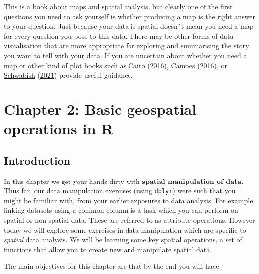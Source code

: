 \documentclass[
]{book}
\begin{document}
This is a book about maps and spatial analysis, but clearly one of the first questions you need to ask yourself is whether producing a map is the right answer to your question. Just because your data is spatial doesn´t mean you need a map for every question you pose to this data. There may be other forms of data visualisation that are more appropriate for exploring and summarising the story you want to tell with your data. If you are uncertain about whether you need a map or other kind of plot books such as \protect\hyperlink{ref-Cairo_2016}{Cairo} (\protect\hyperlink{ref-Cairo_2016}{2016}), \protect\hyperlink{ref-Camoes_2016}{Camoes} (\protect\hyperlink{ref-Camoes_2016}{2016}), or \protect\hyperlink{ref-Schwabish_2021}{Schwabish} (\protect\hyperlink{ref-Schwabish_2021}{2021}) provide useful guidance.

\hypertarget{chapter-2-basic-geospatial-operations-in-r}{%
\chapter{Chapter 2: Basic geospatial operations in R}\label{chapter-2-basic-geospatial-operations-in-r}}

\hypertarget{introduction-2}{%
\section{Introduction}\label{introduction-2}}

In this chapter we get your hands dirty with \textbf{spatial manipulation of data}. Thus far, our data manipulation exercises (using \texttt{dplyr}) were such that you might be familiar with, from your earlier exposures to data analysis. For example, linking datasets using a common column is a task which you can perform on spatial or non-spatial data. These are referred to as attribute operations. However today we will explore some exercises in data manipulation which are specific to \emph{spatial} data analysis. We will be learning some key spatial operations, a set of functions that allow you to create new and manipulate spatial data.

The main objectives for this chapter are that by the end you will have:
\end{document}
